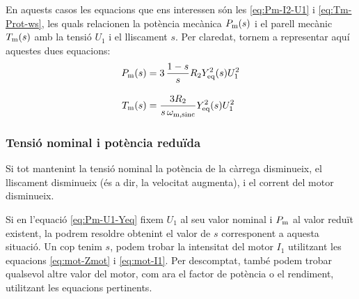 En aquests casos les equacions que ens interessen són les \eqref{eq:Pm-I2-U1} i \eqref{eq:Tm-Prot-ws}, les quals relacionen la potència mecànica $P_\mathrm{m}(s)$ i el parell mecànic $T_\mathrm{m}(s)$ amb la tensió $U_1$ i el lliscament $s$. Per claredat, tornem a representar aquí aquestes dues equacions:
\begin{subequations}
	\begin{align}
	P_\mathrm{m}(s) &= 3 \,\frac{1-s}{s} R_2 Y_\mathrm{eq}^2(s) U_1^2\label{eq:Pm-U1-Yeq} \\[2ex]
	T_\mathrm{m}(s) &=\frac{3 R_2}{s\,\omega_\mathrm{m,sinc}} Y_\mathrm{eq}^2(s) U_1^2\label{eq:Tm-U1-Yeq}
	\end{align}
\end{subequations}

	
\subsubsection{Tensió nominal i potència reduïda}	

Si tot mantenint la tensió nominal la potència de la càrrega disminueix, el lliscament disminueix (és a dir, la velocitat augmenta), i el corrent del motor disminueix.
	
Si en l'equació \eqref{eq:Pm-U1-Yeq} fixem $U_1$ al seu valor nominal i  $P_\mathrm{m}$ al  valor reduït existent,  la podrem resoldre obtenint el valor de $s$ corresponent  a aquesta situació. Un cop tenim $s$, podem trobar la intensitat del motor $I_1$ utilitzant les equacions \eqref{eq:mot-Zmot} i \eqref{eq:mot-I1}. Per descomptat, també podem trobar qualsevol altre valor del motor, com  ara el factor de potència o el rendiment, utilitzant les equacions pertinents.


